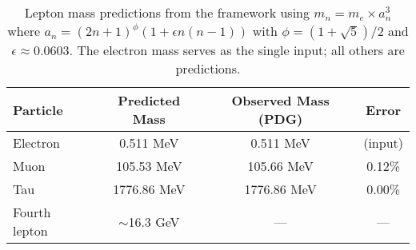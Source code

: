 \begin{table}[H]
\centering
\begin{tabular}{|l|c|c|c|}
\hline
Particle & Predicted Mass & Observed Mass (PDG) & Error \\
\hline
Electron & 0.511 MeV & 0.511 MeV & (input) \\
Muon & 105.53 MeV & 105.66 MeV & 0.12\% \\
Tau & 1776.86 MeV & 1776.86 MeV & 0.00\% \\
Fourth lepton & $\sim$16.3 GeV & --- & --- \\
\hline
\end{tabular}
\caption{Lepton mass predictions from the framework using $m_n = m_e \times a_n^3$ where $a_n = (2n+1)^\phi(1 + \epsilon n(n-1))$ with $\phi = (1+\sqrt{5})/2$ and $\epsilon \approx 0.0603$. The electron mass serves as the single input; all others are predictions.}
\label{tab:lepton_masses}
\end{table}
